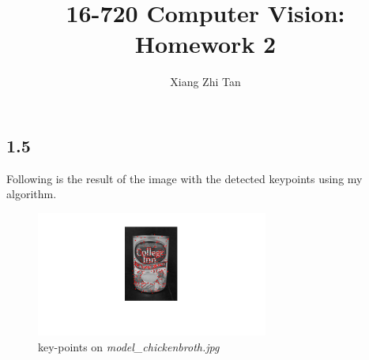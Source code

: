 \documentclass{article}
\begin{document}
\title{16-720 Computer Vision: Homework 2}
\author{Xiang Zhi Tan}

\maketitle
\subsection*{1.5}
Following is the result of the image with the detected keypoints using my algorithm.
\begin{figure}[H]
    \centering
    \includegraphics[width=3.0in]{q-1}
    \caption{key-points on \textit{model\_chickenbroth.jpg}}
\end{figure}
\end{document}
